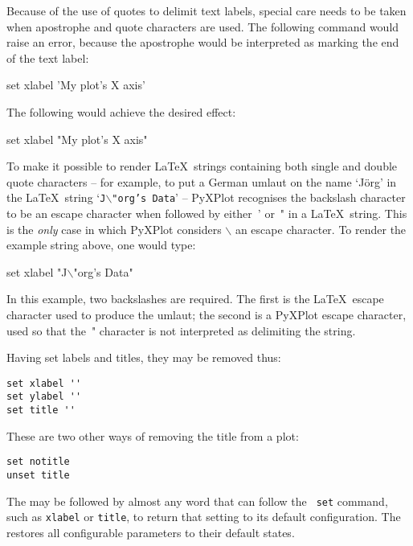 Because of the use of quotes to delimit text labels, special care needs to be
taken when apostrophe and quote characters are used. The following command
would raise an error, because the apostrophe would be interpreted as marking
the end of the text label:

\begin{dontdo}
set xlabel 'My plot's X axis'
\end{dontdo}

\noindent The following would achieve the desired effect:

\begin{dodo}
set xlabel "My plot's X axis"
\end{dodo}

To make it possible to render \LaTeX\ strings containing both single and double
quote characters -- for example, to put a German umlaut on the name `J\"org' in
the \LaTeX\ string `{\tt J$\backslash$"org's Data}' -- PyXPlot recognises the
backslash character to be an escape character when followed by either~' or~" in
a \LaTeX\ string. This is the \textit{only} case in which PyXPlot considers
$\backslash$ an escape character. To render the example string above, one would
type:

\begin{dodo}
set xlabel "J$\backslash$"org's Data"
\end{dodo}

\noindent In this example, two backslashes are required.  The first is the
\LaTeX\ escape character used to produce the umlaut; the second is a PyXPlot
escape character, used so that the~" character is not interpreted as
delimiting the string. 

Having set labels and titles, they may be removed thus:

\begin{verbatim}
set xlabel ''
set ylabel ''
set title ''
\end{verbatim}

\noindent These are two other ways of removing the title from a plot:

\begin{verbatim}
set notitle
unset title
\end{verbatim}

The  may be followed by almost any word that can follow the {\tt
set} command, such as {\tt xlabel} or {\tt title}, to return that setting to
its default configuration. The  restores all configurable
parameters to their default states.

